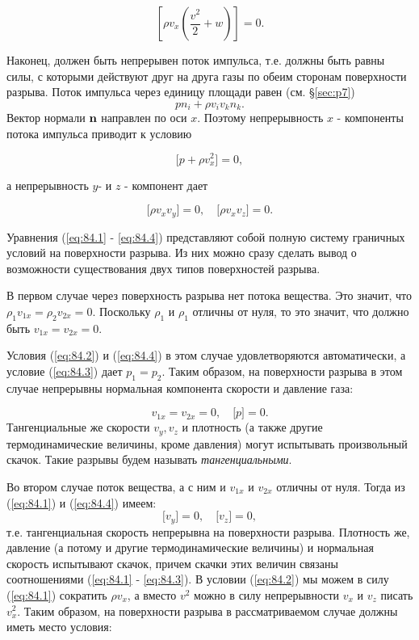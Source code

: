 \begin{equation}
    \label{eq:84.2}
    \left\lbrack \rho v_x ( \frac{v^2}{2} + w) \right\rbrack = 0.
\end{equation}


Наконец, должен быть непрерывен поток импульса, т.е. должны быть равны силы, с которыми действуют друг на друга газы по обеим сторонам поверхности разрыва.
Поток импульса через единицу площади равен (см. \S \ref{sec:p7})
\[
    pn_i + \rho v_i v_k n_k.
\]
Вектор нормали $\mathbf{n}$ направлен по оси $x$. Поэтому непрерывность $x$ - компоненты потока импульса приводит к условию

\begin{equation}
    \label{eq:84.3}
    \lbrack p + \rho v^2_x \rbrack = 0,
\end{equation}

а непрерывность $y$- и $z$ - компонент дает

\begin{equation}
    \label{eq:84.4}
    \lbrack \rho v_x v_y \rbrack = 0, \quad \lbrack \rho v_x v_z \rbrack = 0.
\end{equation}

Уравнения (\ref{eq:84.1} - \ref{eq:84.4}) представляют собой полную систему граничных условий на поверхности разрыва.
Из них можно сразу сделать вывод о возможности существования двух типов поверхностей разрыва.

В первом случае через поверхность разрыва нет потока вещества.
Это значит, что $\rho_1 v_{1x} = \rho_2 v_{2x} = 0$. Поскольку $\rho_1$ и $\rho_1$ отличны от нуля, то это значит, что должно быть $v_{1x} = v_{2x} = 0$.


Условия (\ref{eq:84.2}) и (\ref{eq:84.4}) в этом случае удовлетворяются автоматически, а условие (\ref{eq:84.3}) дает $p_1 = p_2$.
Таким образом, на поверхности разрыва в этом случае непрерывны нормальная компонента скорости и давление газа:

\begin{equation}
    \label{eq:84.5}
    v_{1x} = v_{2x} = 0, \quad \lbrack p \rbrack = 0.
\end{equation}
Тангенциальные же скорости $v_y, v_z$ и плотность (а также другие термодинамические величины, кроме давления) могут испытывать произвольный скачок. Такие разрывы будем называть \emph{тангенциальными}.

Во втором случае поток вещества, а с ним и $v_{1x}$ и $v_{2x}$ отличны от нуля.
Тогда из (\ref{eq:84.1}) и (\ref{eq:84.4}) имеем:
\begin{equation}
    \label{eq:84.6}
    \lbrack v_y \rbrack = 0, \quad \lbrack v_z \rbrack = 0,
\end{equation}
т.е. тангенциальная скорость непрерывна на поверхности разрыва.
Плотность же, давление (а потому и другие термодинамические величины) и нормальная скорость испытывают скачок, причем скачки этих величин связаны соотношениями (\ref{eq:84.1} - \ref{eq:84.3}).
В условии (\ref{eq:84.2}) мы можем в силу (\ref{eq:84.1}) сократить $\rho v_x$, а вместо $v^2$ можно в силу непрерывности $v_x$ и $v_z$ писать $v^2_x$. Таким образом, на поверхности разрыва в рассматриваемом случае должны иметь место условия:

